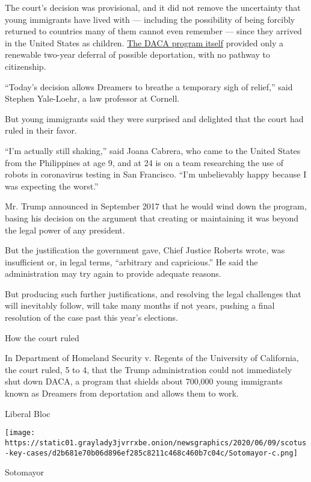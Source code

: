 The court's decision was provisional, and it did not remove the
uncertainty that young immigrants have lived with --- including the
possibility of being forcibly returned to countries many of them cannot
even remember --- since they arrived in the United States as children.
\href{https://www.dhs.gov/news/2012/06/15/secretary-napolitano-announces-deferred-action-process-young-people-who-are-low}{The
DACA program itself} provided only a renewable two-year deferral of
possible deportation, with no pathway to citizenship.

``Today's decision allows Dreamers to breathe a temporary sigh of
relief,'' said Stephen Yale-Loehr, a law professor at Cornell.

But young immigrants said they were surprised and delighted that the
court had ruled in their favor.

``I'm actually still shaking,'' said Joana Cabrera, who came to the
United States from the Philippines at age 9, and at 24 is on a team
researching the use of robots in coronavirus testing in San Francisco.
``I'm unbelievably happy because I was expecting the worst.''

Mr. Trump announced in September 2017 that he would wind down the
program, basing his decision on the argument that creating or
maintaining it was beyond the legal power of any president.

But the justification the government gave, Chief Justice Roberts wrote,
was insufficient or, in legal terms, ``arbitrary and capricious.'' He
said the administration may try again to provide adequate reasons.

But producing such further justifications, and resolving the legal
challenges that will inevitably follow, will take many months if not
years, pushing a final resolution of the case past this year's
elections.

How the court ruled

In Department of Homeland Security v. Regents of the University of
California, the court ruled, 5 to 4, that the Trump administration could
not immediately shut down DACA, a program that shields about 700,000
young immigrants known as Dreamers from deportation and allows them to
work.

Liberal Bloc

\texttt{[image: https://static01.graylady3jvrrxbe.onion/newsgraphics/2020/06/09/scotus-key-cases/d2b681e70b06d896ef285c8211c468c460b7c04c/Sotomayor-c.png]}

Sotomayor

